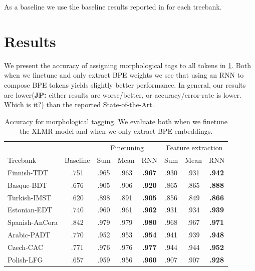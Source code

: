 \documentclass[11pt]{article}
\newcommand\jp[1]{(\textbf{JP:} #1)}
\begin{document}
        As a baseline we use the baseline results reported in
     \citep{mccarthy2019sigmorphon} for each treebank.

	
	\section{Results}
	\label{results}
	
	We present the accuracy of assigning morphological tags to all
        tokens in \cref{tab:results_tokens}. Both when we finetune and
        only extract BPE weights we see that using an RNN to compose
        BPE tokens yields slightly better performance.
	In general, our results are lower\jp{either results are worse/better, or accuracy/error-rate is lower. Which is it?} than the reported State-of-the-Art.
	

	\begin{table} %
	\centering
	\begin{tabular}{l|c|ccc|ccc}
		& & \multicolumn{3}{c}{Finetuning} & \multicolumn{3}{c}{Feature extraction} \\
		Treebank & Baseline & Sum & Mean & RNN & Sum & Mean & RNN \\
		\hline
		Finnish-TDT     & .751 & .965 & .963 & \textbf{.967} & .930 & .931 & \textbf{.942} \\ 
		Basque-BDT      & .676 & .905 & .906 & \textbf{.920} & .865 & .865 & \textbf{.888} \\
		Turkish-IMST    & .620 & .898 & .891 & \textbf{.905} & .856 & .849 & \textbf{.866}\\
		Estonian-EDT    & .740 & .960 & .961 & \textbf{.962} & .931 & .934 & \textbf{.939} \\
		Spanish-AnCora  & .842 & .979 & .979 & \textbf{.980} & .968 & .967 & \textbf{.971} \\
		Arabic-PADT     & .770 & .952 & .953 & \textbf{.954} & .941 & .939 & \textbf{.948} \\
		Czech-CAC       & .771 & .976 & .976 & \textbf{.977} & .944 & .944 & \textbf{.952} \\
		Polish-LFG      & .657 & .959 & .956 & \textbf{.960} & .907 & .907 & \textbf{.928} \\
	\end{tabular}
	\caption{\label{tab:results_tokens} Accuracy for morphological tagging. We evaluate both when we finetune the XLMR model and when we only extract BPE embeddings.}
	\end{table}
\end{document}
